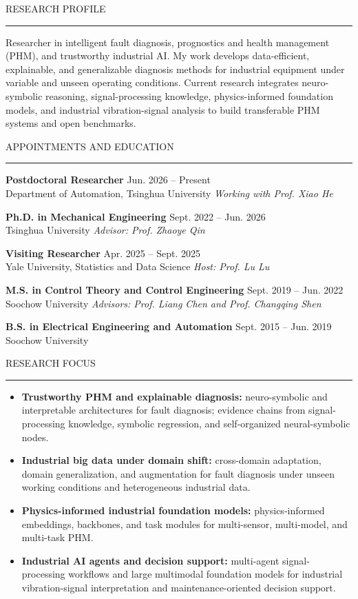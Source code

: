 \documentclass{resume}
\renewenvironment{rSection}[1]{
\sectionskip
\textcolor{TsinghuaPurple}{\MakeUppercase{#1}}
\sectionlineskip
\hrule
\begin{list}{}{\setlength{\leftmargin}{0em}}
\item[]
}{
\end{list}
}
\newcommand{\cvitem}[1]{\item #1}
\newcommand{\entry}[4]{\textbf{#1} \hfill #2\\#3 \hfill \textit{#4}\vspace{0.25em}}
\begin{document}
\small
\sloppy

\begin{rSection}{Research Profile}
Researcher in intelligent fault diagnosis, prognostics and health management (PHM), and trustworthy industrial AI. My work develops data-efficient, explainable, and generalizable diagnosis methods for industrial equipment under variable and unseen operating conditions. Current research integrates neuro-symbolic reasoning, signal-processing knowledge, physics-informed foundation models, and industrial vibration-signal analysis to build transferable PHM systems and open benchmarks.
\end{rSection}

\begin{rSection}{Appointments and Education}
\entry{Postdoctoral Researcher}{Jun. 2026 -- Present}{Department of Automation, Tsinghua University}{Working with Prof. Xiao He}

\entry{Ph.D. in Mechanical Engineering}{Sept. 2022 -- Jun. 2026}{Tsinghua University}{Advisor: Prof. Zhaoye Qin}

\entry{Visiting Researcher}{Apr. 2025 -- Sept. 2025}{Yale University, Statistics and Data Science}{Host: Prof. Lu Lu}

\entry{M.S. in Control Theory and Control Engineering}{Sept. 2019 -- Jun. 2022}{Soochow University}{Advisors: Prof. Liang Chen and Prof. Changqing Shen}

\entry{B.S. in Electrical Engineering and Automation}{Sept. 2015 -- Jun. 2019}{Soochow University}{}
\end{rSection}

\begin{rSection}{Research Focus}
\begin{itemize}[leftmargin=1.2em,itemsep=0.15em,topsep=0.15em]
\cvitem{\textbf{Trustworthy PHM and explainable diagnosis:} neuro-symbolic and interpretable architectures for fault diagnosis; evidence chains from signal-processing knowledge, symbolic regression, and self-organized neural-symbolic nodes.}
\cvitem{\textbf{Industrial big data under domain shift:} cross-domain adaptation, domain generalization, and augmentation for fault diagnosis under unseen working conditions and heterogeneous industrial data.}
\cvitem{\textbf{Physics-informed industrial foundation models:} physics-informed embeddings, backbones, and task modules for multi-sensor, multi-model, and multi-task PHM.}
\cvitem{\textbf{Industrial AI agents and decision support:} multi-agent signal-processing workflows and large multimodal foundation models for industrial vibration-signal interpretation and maintenance-oriented decision support.}
\end{itemize}
\end{rSection}
\end{document}
